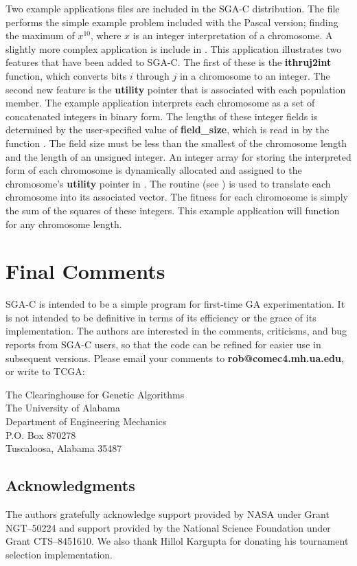 Two example applications files are included in the SGA-C distribution.  The
file {} performs the simple example problem 
included with the Pascal version; 
finding the maximum of $x^{10}$, where $x$
is an integer interpretation of a chromosome.  
A slightly more complex 
application 
is include in {}.
This application illustrates two features that have been added
to SGA-C. The first of these is the {\bf ithruj2int} function,
which converts bits $i$ through $j$ in a chromosome to an integer.
The second new feature is the {\bf utility} pointer that is associated with each population member.
The example application interprets each chromosome as a set 
of concatenated integers in binary form. The lengths of these integer fields is 
determined by the user-specified value of {\bf field\_size}, which is 
read in by the function
{}.  The field size must be less than the smallest of
the chromosome
length and the length of an unsigned integer.  
An integer array for storing the interpreted form of each chromosome
is dynamically allocated and assigned to the chromosome's {\bf utility} pointer
in {}.
The {} routine (see {}) is used to translate 
each chromosome into its associated vector.
The fitness for each chromosome is simply the sum of the squares of these 
integers. This example application will function for any chromosome length. 

\section{Final Comments}
SGA-C is intended to be a simple
program for first-time GA experimentation. It is 
not intended to be 
definitive in terms of its efficiency 
or the grace of its implementation. The
authors are interested in the comments, criticisms, and bug reports
from SGA-C users, so that the code can be refined for
easier use in subsequent versions.
Please email your comments to {\bf rob@comec4.mh.ua.edu},
or write to TCGA:
\begin{center}
The Clearinghouse for Genetic Algorithms\\
The University of Alabama\\
Department of Engineering Mechanics\\
P.O. Box 870278\\
Tuscaloosa, Alabama 35487
\end{center}

\subsection*{Acknowledgments}
The authors gratefully acknowledge support provided by NASA under
Grant NGT--50224 and support provided by the 
National Science Foundation under Grant CTS--8451610.
We also thank Hillol Kargupta for donating his tournament selection
implementation.




